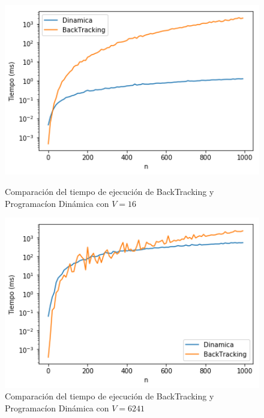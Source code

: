 \begin{figure}[H] 
    \centering
    \begin{minipage}{0.45\textwidth}
        \centering
        \includegraphics[width=1\textwidth]{img/tiempo/v/tiempoBackDinamicavChico.png} %
        \caption{Comparaci\'on del tiempo de ejecuci\'on de BackTracking y Programac\'ion Din\'amica con $V = 16$}
        \label{fig:tiempoBackDinamicavChico} 
    \end{minipage}\hfill
    \begin{minipage}{0.45\textwidth}
        \centering
        \includegraphics[width=1\textwidth]{img/tiempo/v/tiempoBackDinamicavGrande.png} %
        \caption{Comparaci\'on del tiempo de ejecuci\'on de BackTracking y Programac\'ion Din\'amica con $V = 6241$}
        \label{fig:tiempoBackDinamicavGrande} 
    \end{minipage}
\end{figure}


